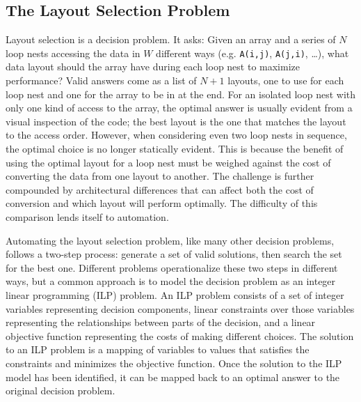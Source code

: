 \subsection{The Layout Selection Problem}

Layout selection is a decision problem.
It asks: Given an array and a series of $N$ loop nests accessing the data in $W$ different ways (e.g. \verb.A(i,j)., \verb.A(j,i)., \dots), what data layout should the array have during each loop nest to maximize performance?
Valid answers come as a list of $N+1$ layouts, one to use for each loop nest and one for the array to be in at the end.
For an isolated loop nest with only one kind of access to the array, the optimal answer is usually evident from a visual inspection of the code; the best layout is the one that matches the layout to the access order.
However, when considering even two loop nests in sequence, the optimal choice is no longer statically evident.
This is because the benefit of using the optimal layout for a loop nest must be weighed against the cost of converting the data from one layout to another.
The challenge is further compounded by architectural differences that can affect both the cost of conversion and which layout will perform optimally.
The difficulty of this comparison lends itself to automation.

Automating the layout selection problem, like many other decision problems, follows a two-step process: generate a set of valid solutions, then search the set for the best one.
Different problems operationalize these two steps in different ways, but a common approach is to model the decision problem as an integer linear programming (ILP) problem.
An ILP problem consists of a set of integer variables representing decision components, linear constraints over those variables representing the relationships between parts of the decision, and a linear objective function representing the costs of making different choices.
The solution to an ILP problem is a mapping of variables to values that satisfies the constraints and minimizes the objective function.
Once the solution to the ILP model has been identified, it can be mapped back to an optimal answer to the original decision problem.


